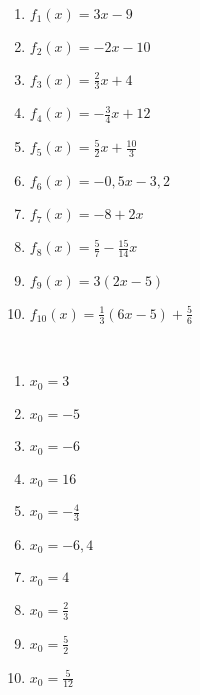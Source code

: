 \begin{Exercise}[title={Bestimme die Nullstellen}, label=nullstellenA1]\ \\
	\begin{minipage}{0.5\textwidth}
		\begin{enumerate}[label=\alph*)]
			\item $f_1(x)=3x-9$
			\item $f_2(x)=-2x-10$
			\item $f_3(x)=\frac{2}{3}x+4$
			\item $f_4(x)=-\frac{3}{4}x+12$
			\item $f_5(x)=\frac{5}{2}x+\frac{10}{3}$
		\end{enumerate}
	\end{minipage}
	\begin{minipage}{0.5\textwidth}
		\begin{enumerate}[label=\alph*)]
			\setcounter{enumi}{5}
			\item $f_6(x)=-0,5x-3,2$
			\item $f_7(x)=-8+2x$
			\item $f_8(x)=\frac{5}{7}-\frac{15}{14}x$
			\item $f_9(x)=3(2x-5)$
			\item $f_{10}(x)=\frac{1}{3}\left(6x-5\right)+\frac{5}{6}$
		\end{enumerate}
	\end{minipage}
\end{Exercise}\vspace{0,5cm}
\begin{Answer}[ref=nullstellenA1]\\
	\begin{minipage}{0.5\textwidth}
		\begin{enumerate}[label=\alph*)]
			\item $x_0=3$
			\item $x_0=-5$
			\item $x_0=-6$
			\item $x_0=16$
			\item $x_0=-\frac{4}{3}$
		\end{enumerate}
	\end{minipage}
	\begin{minipage}{0.5\textwidth}
		\begin{enumerate}[label=\alph*)]
			\setcounter{enumi}{5}
			\item $x_0=-6,4$
			\item $x_0=4$
			\item $x_0=\frac{2}{3}$
			\item $x_0=\frac{5}{2}$
			\item $x_0=\frac{5}{12}$
		\end{enumerate}
	\end{minipage}
\end{Answer}
